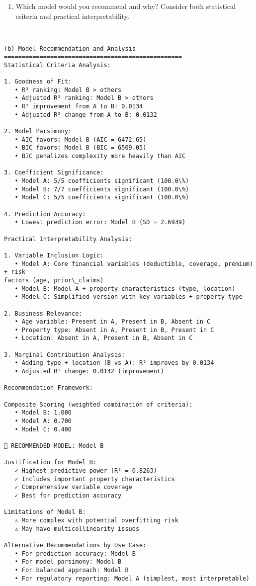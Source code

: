 \documentclass[8pt, twocolumn]{extarticle}
\providecommand{\tightlist}{%
      \setlength{\itemsep}{0pt}\setlength{\parskip}{0pt}}
\begin{document}
    \begin{enumerate}
\def\labelenumi{(\alph{enumi})}
\setcounter{enumi}{1}
\tightlist
\item
  Which model would you recommend and why? Consider both statistical
  criteria and practical interpretability.
\end{enumerate}

    \begin{Verbatim}[commandchars=\\\{\}]


(b) Model Recommendation and Analysis
==================================================
Statistical Criteria Analysis:

1. Goodness of Fit:
   • R² ranking: Model B > others
   • Adjusted R² ranking: Model B > others
   • R² improvement from A to B: 0.0134
   • Adjusted R² change from A to B: 0.0132

2. Model Parsimony:
   • AIC favors: Model B (AIC = 6472.65)
   • BIC favors: Model B (BIC = 6509.05)
   • BIC penalizes complexity more heavily than AIC

3. Coefficient Significance:
   • Model A: 5/5 coefficients significant (100.0\%)
   • Model B: 7/7 coefficients significant (100.0\%)
   • Model C: 5/5 coefficients significant (100.0\%)

4. Prediction Accuracy:
   • Lowest prediction error: Model B (SD = 2.6939)

Practical Interpretability Analysis:

1. Variable Inclusion Logic:
   • Model A: Core financial variables (deductible, coverage, premium) + risk
factors (age, prior\_claims)
   • Model B: Model A + property characteristics (type, location)
   • Model C: Simplified version with key variables + property type

2. Business Relevance:
   • Age variable: Present in A, Present in B, Absent in C
   • Property type: Absent in A, Present in B, Present in C
   • Location: Absent in A, Present in B, Absent in C

3. Marginal Contribution Analysis:
   • Adding type + location (B vs A): R² improves by 0.0134
   • Adjusted R² change: 0.0132 (improvement)

Recommendation Framework:

Composite Scoring (weighted combination of criteria):
   • Model B: 1.000
   • Model A: 0.700
   • Model C: 0.400

🎯 RECOMMENDED MODEL: Model B

Justification for Model B:
   ✓ Highest predictive power (R² = 0.8263)
   ✓ Includes important property characteristics
   ✓ Comprehensive variable coverage
   ✓ Best for prediction accuracy

Limitations of Model B:
   ⚠ More complex with potential overfitting risk
   ⚠ May have multicollinearity issues

Alternative Recommendations by Use Case:
   • For prediction accuracy: Model B
   • For model parsimony: Model B
   • For balanced approach: Model B
   • For regulatory reporting: Model A (simplest, most interpretable)
    \end{Verbatim}
\end{document}
